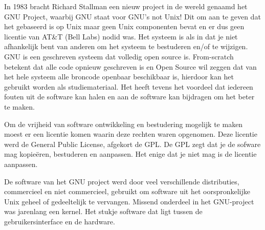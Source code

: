 In 1983 bracht Richard Stallman een nieuw project in de wereld genaamd het GNU Project, waarbij GNU staat
voor GNU's not Unix! Dit om aan te geven dat het gebaseerd is op Unix maar geen Unix componenten bevat en er dus geen licentie van AT\&T (Bell Labs) nodid was. Het systeem is  als in dat je niet afhankelijk bent van anderen om het systeem te bestuderen en/of te wijzigen. GNU is een  geschreven systeem dat volledig open source is. From-scratch betekent dat alle code opnieuw geschreven is en Open Source wil zeggen dat van het hele systeem alle broncode openbaar
beschikbaar is, hierdoor kan het gebruikt worden als studiemateriaal. Het heeft tevens het voordeel dat iedereen fouten
uit de software kan halen en aan de software kan bijdragen om het beter te maken.

Om de vrijheid van software ontwikkeling en bestudering mogelijk te maken moest er een licentie komen waarin deze rechten waren opgenomen. Deze licentie werd de General Public License, afgekort de GPL. De GPL zegt dat je de sofware mag kopie\"eren, bestuderen en aanpassen. Het enige dat je niet mag is de licentie aanpassen.

De software van het GNU project werd door veel verschillende distributies, commercieel en niet commercieel, gebruikt om software uit het oorspronkelijke Unix geheel of gedeeltelijk
te vervangen. Missend onderdeel in het GNU-project was jarenlang een kernel. Het stukje software dat ligt tussen de gebruikersinterface en de hardware.

